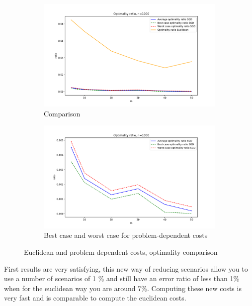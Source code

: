 \documentclass{amsart}
\begin{document}
\begin{figure}[ht]
    \centering
    \begin{subfigure}[b]{0.495\textwidth}
        \centering
        \includegraphics[width=1.1\textwidth]{plots/comparison ratio dependent - euclidean.pdf}
        \caption{Comparison}
    \end{subfigure}
    \hfill
    \begin{subfigure}[b]{0.495\textwidth}
        \centering
        \includegraphics[width=1.1\textwidth]{plots/ratio cost dependent.pdf}
        \caption{Best case and worst case for problem-dependent costs}
    \end{subfigure}
    \caption{Euclidean and problem-dependent costs, optimality comparison}
    \label{methods}
\end{figure}

First results are very satisfying, this new way of reducing scenarios allow you to use a number of scenarios of 1 \% and still have an error ratio of less than 1\% when for the euclidean way you are around 7\%. Computing these new costs is very fast and is comparable to compute the euclidean costs. 
\end{document}
